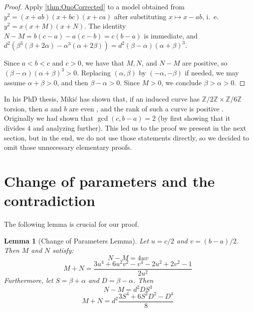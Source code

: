 \documentclass{article}
\theoremstyle{plain}
\newtheorem{lemma}[theorem]{Lemma}
\newtheorem{remark}[theorem]{Remark}
\newtheorem{setup}[theorem]{Assumptions}
\newcommand{\Z}{\mathbb{Z}}
\newcommand{\Q}{\mathbb{Q}}
\newcommand{\tors}{\mathrm{tors}}
\begin{document}

\begin{proof}
Apply \cref{thm:OnoCorrected} to a model obtained from $y^2=(x+ab)(x+bc)(x+ca)$ after substituting $x \mapsto x-ab$, i.~e.~\(y^2=x(x+M)(x+N)\).
The identity \(N-M=b(c-a)-a(c-b)=c(b-a)\) is immediate, and
\(d^2\left(\beta^3(\beta+2\alpha)-\alpha^3(\alpha+2\beta)\right) = d^2(\beta-\alpha)(\alpha+\beta)^3\).

Since \(a<b<c\) and \(c>0\), we have that \(M,N\), and \(N-M\) are positive, so
\((\beta-\alpha)(\alpha+\beta)^3>0\). Replacing \((\alpha,\beta)\) by \((-\alpha,-\beta)\) if needed, we may assume \(\alpha+\beta>0\), and then \(\beta-\alpha>0\). Since \(M>0\), we conclude \(\beta>\alpha > 0\).
\end{proof}



 In his PhD thesis, Mikić has shown that, if an induced curve has \(\Z/2\Z\times\Z/6\Z\) torsion, then $a$ and $b$ are even \cite[Teorem 2.19]{Miljen}, and the rank of such a curve is positive \cite[Lema 2.20]{Miljen}. Originally we had shown that \(\gcd(c, b-a) = 2\) (by first showing that it divides \(4\) and analyzing further). This led us to the proof we present in the next section, but in the end, we do not use those statements directly, so we decided to omit those unnecessary elementary proofs.


\section{Change of parameters and the contradiction}

The following lemma is crucial for our proof. 
\begin{lemma}[Change of Parameters Lemma]\label{lem:surfMap}
Let $u = c/2$ and $v = (b-a)/2$. 
Then $M$ and $N$ satisfy:
\[ N-M = 4uv \]
\[ M+N = \frac{3u^4 + 6u^2v^2 - v^4 - 2u^2 + 2v^2 - 1}{2u^2} \]
Furthermore, let $S = \beta+\alpha$ and $D = \beta-\alpha$. Then
\[ N-M = d^2 D S^3 \]
\[ M+N = d^2 \frac{3S^4 + 6S^2D^2 - D^4}{8} \]
\end{lemma}
\end{document}
